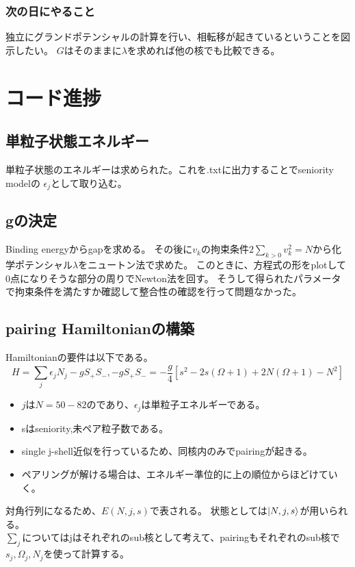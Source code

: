 \documentclass[a4paper,12pt]{jsreport}
\begin{document}
\subsection*{次の日にやること}
独立にグランドポテンシャルの計算を行い、相転移が起きているということを図示したい。
$G$はそのままに$\lambda$を求めれば他の核でも比較できる。

\chapter{コード進捗}
\section{単粒子状態エネルギー}
単粒子状態のエネルギーは求められた。これを.txtに出力することでseniority modelの
$\epsilon_j$として取り込む。
\section{gの決定}
Binding energyからgapを求める。
その後に$v_k$の拘束条件$2\sum_{k>0}v_k^2=N$から化学ポテンシャル$\lambda$をニュートン法で求めた。
このときに、方程式の形をplotして0点になりそうな部分の周りでNewton法を回す。
そうして得られたパラメータで拘束条件を満たすか確認して整合性の確認を行って問題なかった。
\section{pairing Hamiltonianの構築}
Hamiltonianの要件は以下である。
\begin{equation}
  H=\sum_{j}\epsilon_j N_j -g S_+ S_-,
  -g S_+ S_- = -\dfrac{g}{4}\left[s^2 -2s(\Omega+1)+2N(\Omega+1)-N^2\right]
\end{equation}
\begin{itemize}
  \item $j$は$N=50-82$のであり、$\epsilon_j$は単粒子エネルギーである。
  \item sはseniority,未ペア粒子数である。
  \item single j-shell近似を行っているため、同核内のみでpairingが起きる。
  \item ペアリングが解ける場合は、エネルギー準位的に上の順位からほどけていく。
\end{itemize}
対角行列になるため、$E(N,j,s)$で表される。
状態としては$\ket{N,j,s}$が用いられる。\\
$\sum_j $についてはjはそれぞれのsub核として考えて、pairingもそれぞれのsub核で
$s_j,\Omega_j,N_j$を使って計算する。
\end{document}
